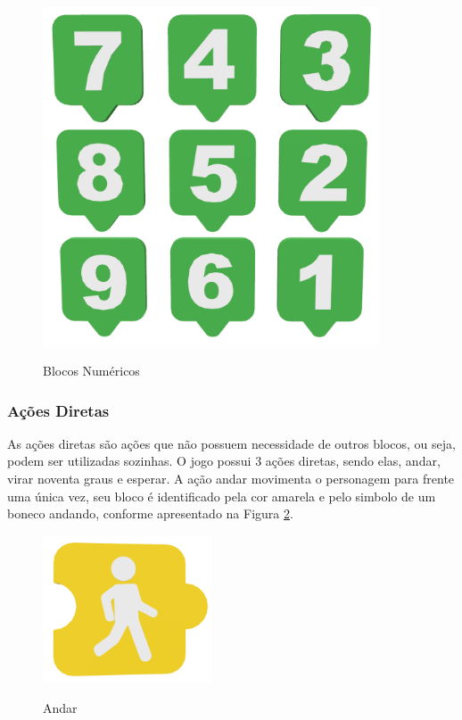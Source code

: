         \begin{figure}[H]
            \caption{Blocos Numéricos}
            \centering
            \includegraphics[width=10cm]{Imagens/Cap3/Blocos/Blocos_Numericos.png}
            \label{figura:blocos_numericos}
        \end{figure}
    
    \subsubsection{Ações Diretas}
        As ações diretas são ações que não possuem necessidade de outros blocos, ou seja, podem ser utilizadas sozinhas.
        O jogo possui 3 ações diretas, sendo elas, andar, virar noventa graus e esperar. 
        A ação andar movimenta o personagem para frente uma única vez, seu bloco é identificado pela cor amarela e pelo simbolo de um boneco andando, conforme apresentado na Figura \ref{figura:andar}.
        
        \begin{figure}[H]
            \caption{Andar}
            \centering
            \includegraphics[width=5cm]{Imagens/Cap3/Blocos/Andar.png}
            \label{figura:andar}
        \end{figure}
        
